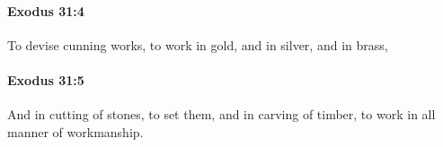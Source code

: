 		\paragraph{Exodus 31:4} %
			\label{EXODUS-31-4}

			To devise cunning works, to work in gold, and in silver, and in brass,


		\paragraph{Exodus 31:5} %
			\label{EXODUS-31-5}

			And in cutting of stones, to set them, and in carving of timber, to work in all manner of workmanship.


